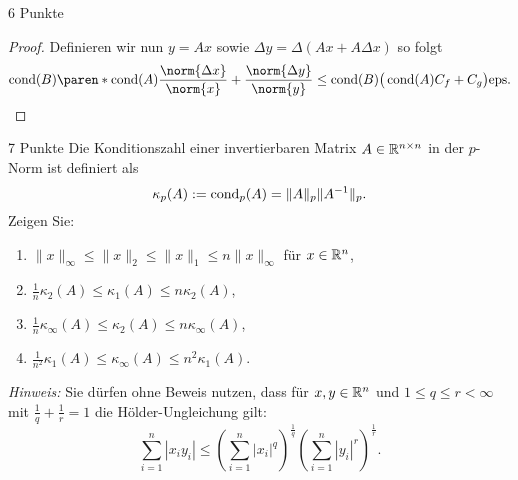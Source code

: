 \documentclass{problemset}
\begin{document}
\begin{problem}{6 Punkte}
\begin{proof}
    Definieren wir nun \(y = Ax\) sowie \(\Delta y = \Delta (Ax + A \Delta x)\)
    so folgt
    \[
        \cond(B) \paren*{ \cond(A) \frac{\norm{\Delta x}}{\norm{x}}
            + \frac{\norm{\Delta y}}{\norm{y}}}
        \le \cond(B) \big(\cond(A) C_f + C_g\big) \text{eps}.
    \]
\end{proof}
\end{problem}

\begin{problem}{7 Punkte}
Die Konditionszahl einer invertierbaren Matrix \( A \in \mathbb{R}^{n \times n}
\) in der \( p \)-Norm ist definiert als
\[
    \kappa_p(A) := \operatorname{cond}_p(A) = \|A\|_p \|A^{-1}\|_p.
\]
Zeigen Sie:
\begin{enumerate}
    \item \( \|x\|_\infty \leq \|x\|_2 \leq \|x\|_1 \leq n \|x\|_\infty \) für \( x \in \mathbb{R}^n \),
    \item \( \frac{1}{n} \kappa_2(A) \leq \kappa_1(A) \leq n \kappa_2(A) \),
    \item \( \frac{1}{n} \kappa_\infty(A) \leq \kappa_2(A) \leq n \kappa_\infty(A) \),
    \item \( \frac{1}{n^2} \kappa_1(A) \leq \kappa_\infty(A) \leq n^2 \kappa_1(A) \).
\end{enumerate}

\textit{Hinweis:} Sie dürfen ohne Beweis nutzen, dass für \( x, y \in \mathbb{R}^n \) und \( 1
\leq q \leq r < \infty \) mit \( \frac{1}{q} + \frac{1}{r} = 1 \) die
Hölder-Ungleichung gilt:
\[
    \sum_{i=1}^n |x_i y_i| \leq \left( \sum_{i=1}^n |x_i|^q \right)^{\frac{1}{q}} \left( \sum_{i=1}^n |y_i|^r \right)^{\frac{1}{r}}.
\]
\end{problem}
\end{document}
